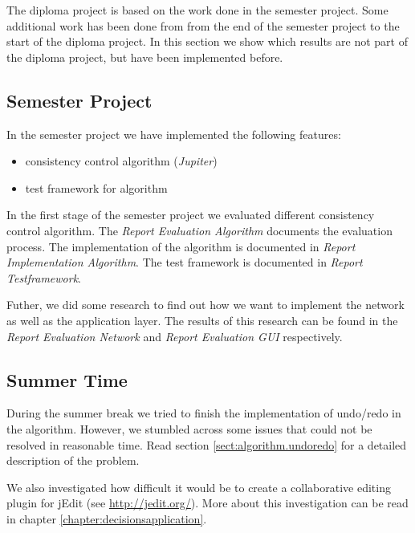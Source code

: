The diploma project is based on the work done in the semester project. Some
additional work has been done from from the end of the semester
project to the start of the diploma project. In this section we show which
results are not part of the diploma project, but have been implemented
before.

\subsection{Semester Project}
In the semester project we have implemented the following features:
\begin{itemize}
 \item consistency control algorithm (\emph{Jupiter})
 \item test framework for algorithm
\end{itemize}

In the first stage of the semester project we evaluated different
consistency control algorithm. The \emph{Report Evaluation Algorithm}
documents the evaluation process. The implementation of the
algorithm is documented in \emph{Report Implementation Algorithm}. The
test framework is documented in \emph{Report Testframework}.

Futher, we did some research to find out how we want to implement the
network as well as the application layer. The results of this research
can be found in the \emph{Report Evaluation Network} and 
\emph{Report Evaluation GUI} respectively.


\subsection{Summer Time}
During the summer break we tried to finish the implementation of undo/redo
in the algorithm. However, we stumbled across some issues that could not
be resolved in reasonable time. Read section \ref{sect:algorithm.undoredo} for
a detailed description of the problem.

We also investigated how difficult it would be to create a collaborative 
editing plugin for jEdit (see \href{http://jedit.org/}{http://jedit.org/}).
More about this investigation can be read in chapter 
\ref{chapter:decisionsapplication}.

